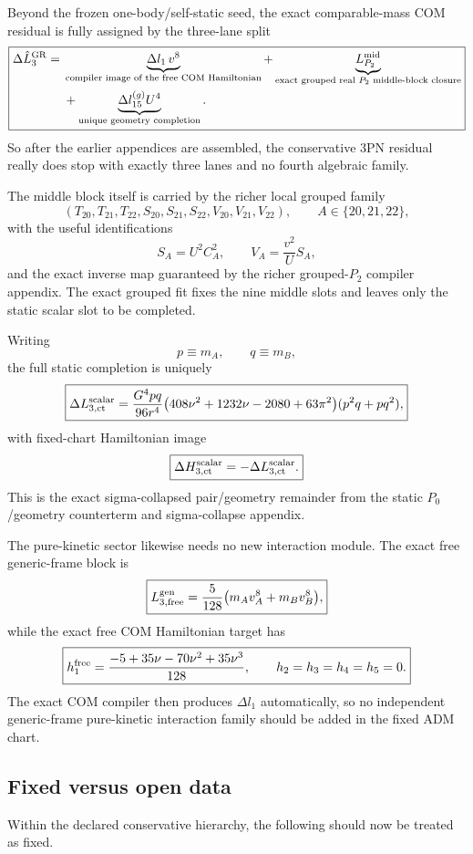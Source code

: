 \documentclass[11pt]{article}
\begin{document}
Beyond the frozen one-body/self-static seed, the exact comparable-mass COM residual is fully assigned by the three-lane split
\[
\boxed{
\begin{aligned}
\Delta \hat L_3^{\rm GR}
=\;&\underbrace{\Delta l_1\,v^8}_{\text{compiler image of the free COM Hamiltonian}}
+\underbrace{L_{P_2}^{\rm mid}}_{\text{exact grouped real }P_2\text{ middle-block closure}}
\\
&+\underbrace{\Delta l_{15}^{(g)}U^4}_{\text{unique geometry completion}}.
\end{aligned}
}
\]
So after the earlier appendices are assembled, the conservative $3$PN residual really does stop with exactly three lanes and no fourth algebraic family.

The middle block itself is carried by the richer local grouped family
\[
(T_{20},T_{21},T_{22},S_{20},S_{21},S_{22},V_{20},V_{21},V_{22}),
\qquad
A\in\{20,21,22\},
\]
with the useful identifications
\[
S_A=U^2C_A^2,
\qquad
V_A=\frac{v^2}{U}S_A,
\]
and the exact inverse map guaranteed by the richer grouped-$P_2$ compiler appendix. The exact grouped fit fixes the nine middle slots and leaves only the static scalar slot to be completed.

Writing
\[
p\equiv m_A,
\qquad
q\equiv m_B,
\]
the full static completion is uniquely
\[
\boxed{
\Delta L_{3,\rm ct}^{\rm scalar}
=
\frac{G^4pq}{96r^4}
\bigl(408\nu^2+1232\nu-2080+63\pi^2\bigr)
(p^2q+pq^2),
}
\]
with fixed-chart Hamiltonian image
\[
\boxed{
\Delta H_{3,\rm ct}^{\rm scalar}=-\Delta L_{3,\rm ct}^{\rm scalar}.
}
\]
This is the exact sigma-collapsed pair/geometry remainder from the static $P_0$/geometry counterterm and sigma-collapse appendix.

The pure-kinetic sector likewise needs no new interaction module. The exact free generic-frame block is
\[
\boxed{
L_{3,\rm free}^{\rm gen}=
\frac{5}{128}\bigl(m_Av_A^8+m_Bv_B^8\bigr),
}
\]
while the exact free COM Hamiltonian target has
\[
\boxed{
 h_1^{\rm free}=
 \frac{-5+35\nu-70\nu^2+35\nu^3}{128},
 \qquad
 h_2=h_3=h_4=h_5=0.
}
\]
The exact COM compiler then produces $\Delta l_1$ automatically, so no independent generic-frame pure-kinetic interaction family should be added in the fixed ADM chart.

\subsection{Fixed versus open data}
\label{app:theorem-ledger-fixed-open}

Within the declared conservative hierarchy, the following should now be treated as fixed.
\end{document}
